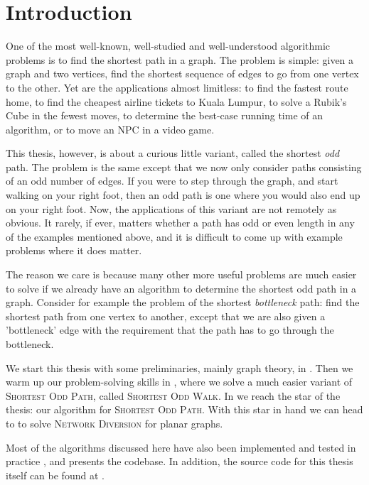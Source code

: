 \chapter{Introduction}

One of the most well-known, well-studied and well-understood algorithmic problems is to find the shortest path in a graph. The problem is simple: given a graph and two vertices, find the shortest sequence of edges to go from one vertex to the other. Yet are the applications almost limitless: to find the fastest route home, to find the cheapest airline tickets to Kuala Lumpur, to solve a Rubik's Cube in the fewest moves, to determine the best-case running time of an algorithm, or to move an NPC in a video game.

This thesis, however, is about a curious little variant, called the shortest \emph{odd} path. The problem is the same except that we now only consider paths consisting of an odd number of edges. If you were to step through the graph, and start walking on your right foot, then an odd path is one where you would also end up on your right foot. Now, the applications of this variant are not remotely as obvious. It rarely, if ever, matters whether a path has odd or even length in any of the examples mentioned above, and it is difficult to come up with example problems where it does matter.

The reason we care is because many other more useful problems are much easier to solve if we already have an algorithm to determine the shortest odd path in a graph. Consider for example the problem of the shortest \emph{bottleneck} path: find the shortest path from one vertex to another, except that we are also given a 'bottleneck' edge with the requirement that the path has to go through the bottleneck. 



We start this thesis with some preliminaries, mainly graph theory, in . Then we warm up our problem-solving skills in , where we solve a much easier variant of \textsc{Shortest Odd Path}, called \textsc{Shortest Odd Walk}. In  we reach the star of the thesis: our algorithm for \textsc{Shortest Odd Path}. With this star in hand we can head to  to solve \textsc{Network Diversion} for planar graphs. 

Most of the algorithms discussed here have also been implemented and tested in practice \cite{source:codebase}, and  presents the codebase. In addition, the source code for this thesis itself can be found at \cite{source:thesis}.

